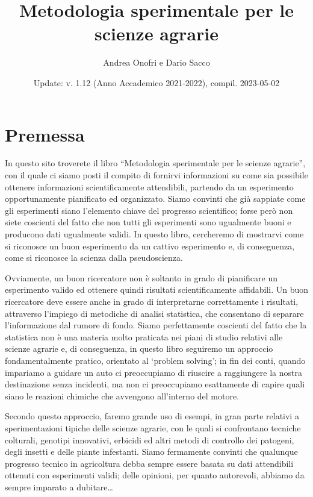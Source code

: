 \documentclass[a4paper,12pt,oneside]{book}
\author{Andrea Onofri e Dario Sacco}
\date{Update: v. 1.12 (Anno Accademico 2021-2022), compil. 2023-05-02}
\title{Metodologia sperimentale per le scienze agrarie}
\subtitle{}
\begin{document}
\maketitle
\tableofcontents

\hypertarget{premessa}{%
\chapter*{Premessa}\label{premessa}}

In questo sito troverete il libro ``Metodologia sperimentale per le scienze agrarie'', con il quale ci siamo posti il compito di fornirvi informazioni su come sia possibile ottenere informazioni scientificamente attendibili, partendo da un esperimento opportunamente pianificato ed organizzato. Siamo convinti che già sappiate come gli esperimenti siano l'elemento chiave del progresso scientifico; forse però non siete coscienti del fatto che non tutti gli esperimenti sono ugualmente buoni e producono dati ugualmente validi. In questo libro, cercheremo di mostrarvi come si riconosce un buon esperimento da un cattivo esperimento e, di conseguenza, come si riconosce la scienza dalla pseudoscienza.

Ovviamente, un buon ricercatore non è soltanto in grado di pianificare un esperimento valido ed ottenere quindi risultati scientificamente affidabili. Un buon ricercatore deve essere anche in grado di interpretarne correttamente i risultati, attraverso l'impiego di metodiche di analisi statistica, che consentano di separare l'informazione dal rumore di fondo. Siamo perfettamente coscienti del fatto che la statistica non è una materia molto praticata nei piani di studio relativi alle scienze agrarie e, di conseguenza, in questo libro seguiremo un approccio fondamentalmente pratico, orientato al `problem solving'; in fin dei conti, quando impariamo a guidare un auto ci preoccupiamo di riuscire a raggiungere la nostra destinazione senza incidenti, ma non ci preoccupiamo esattamente di capire quali siano le reazioni chimiche che avvengono all'interno del motore.

Secondo questo approccio, faremo grande uso di esempi, in gran parte relativi a sperimentazioni tipiche delle scienze agrarie, con le quali si confrontano tecniche colturali, genotipi innovativi, erbicidi ed altri metodi di controllo dei patogeni, degli insetti e delle piante infestanti. Siamo fermamente convinti che qualunque progresso tecnico in agricoltura debba sempre essere basata su dati attendibili ottenuti con esperimenti validi; delle opinioni, per quanto autorevoli, abbiamo da sempre imparato a dubitare\ldots{}
\end{document}
